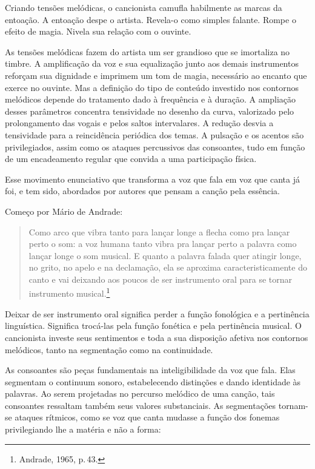 Criando tensões melódicas, o cancionista camufla habilmente as marcas da
entoação. A entoação despe o artista. Revela-o como simples falante. Rompe o
efeito de magia. Nivela sua relação com o ouvinte.

As tensões melódicas fazem do artista um ser grandioso que se imortaliza
no timbre. A amplificação da voz e sua equalização junto aos demais
instrumentos reforçam sua dignidade e imprimem um tom de magia,
necessário ao encanto que exerce no ouvinte. Mas a definição do tipo de
conteúdo investido nos contornos melódicos depende do tratamento dado à
frequência e à duração. A ampliação desses parâmetros concentra
tensividade no desenho da curva, valorizado pelo prolongamento das
vogais e pelos saltos intervalares. A redução desvia a tensividade para
a reincidência periódica dos temas. A pulsação e os acentos são
privilegiados, assim como os ataques percussivos das consoantes, tudo em
função de um encadeamento regular que convida a uma participação física.

Esse movimento enunciativo que transforma a voz que fala em voz que
canta já foi, e tem sido, abordados por autores que pensam a canção pela
essência.

Começo por Mário de Andrade:

\begin{quote}
Como arco que vibra tanto para lançar longe a flecha como pra lançar
perto o som: a voz humana tanto vibra pra lançar perto a palavra como
lançar longe o som musical. E quanto a palavra falada quer atingir
longe, no grito, no apelo e na declamação, ela se aproxima
caracteristicamente do canto e vai deixando aos poucos de ser
instrumento oral para se tornar instrumento musical.\footnote{Andrade, 1965,
p.\,43.}
\end{quote}

Deixar de ser instrumento oral significa perder a função fonológica e a
pertinência linguística. Significa trocá-las pela função fonética e pela
pertinência musical. O cancionista investe seus sentimentos e toda a sua
disposição afetiva nos contornos melódicos, tanto na segmentação como na
continuidade.

As consoantes são peças fundamentais na inteligibilidade da voz que
fala. Elas segmentam o continuum sonoro, estabelecendo distinções e
dando identidade às palavras. Ao serem projetadas no percurso melódico
de uma canção, tais consoantes ressaltam também seus valores
substanciais. As segmentações tornam-se ataques rítmicos, como se voz
que canta mudasse a função dos fonemas privilegiando lhe a matéria e não
a forma:

